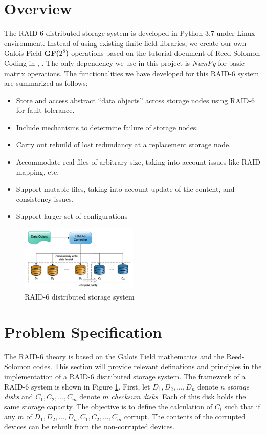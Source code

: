 \documentclass[journal]{IEEEtran}
\begin{document}
\section{Overview}
\label{sec2}
The RAID-6 distributed storage system is developed in Python 3.7 under Linux environment. Instead of using existing finite field libraries, we create our own Galois Field \textbf{GF($2^8$)} operations based on the tutorial document of Reed-Solomon Coding in \cite{RAID-6}, \cite{tutorial}. The only dependency we use in this project is \emph{NumPy} for basic matrix operations. The functionalities we have developed for this RAID-6 system are summarized as follows:
\begin{itemize}
	\item Store and access abstract “data objects” across storage nodes using RAID-6 for fault-tolerance.
	\item Include mechanisms to determine failure of storage nodes.
	\item Carry out rebuild of lost redundancy at a replacement storage node.
	\item Accommodate real files of arbitrary size, taking into account issues like RAID mapping, etc. 
	\item Support mutable files, taking into account update of the content, and consistency issues.
	\item Support larger set of configurations
\end{itemize}

\begin{figure}[htbp]

	\centering

	\captionsetup{justification=centering}

	\includegraphics[width=0.5\textwidth]{fig/RAID-6.jpg}

	\caption{RAID-6 distributed storage system}

	\label{fig1}
\end{figure}


\section{Problem Specification}
\label{sec3}
The RAID-6 theory is based on the Galois Field mathematics and the Reed-Solomon codes. This section will provide relevant definations and principles in the implementation of a RAID-6 distributed storage system. The framework of a RAID-6 system is shown in Figure \ref{fig1}. First, let $D_1, D_2, ... , D_n$ denote $n$ \emph{storage disks} and $C_1, C_2, ... , C_m$ denote $m$ \emph{checksum disks}. Each of this disk holds the same storage capacity. The objective is to define the calculation of $C_i$ such that if any $m$ of $D_1, D_2, ... , D_n, C_1, C_2, ... , C_m$ corrupt. The contents of the corrupted devices can be rebuilt from the non-corrupted devices.
\end{document}
